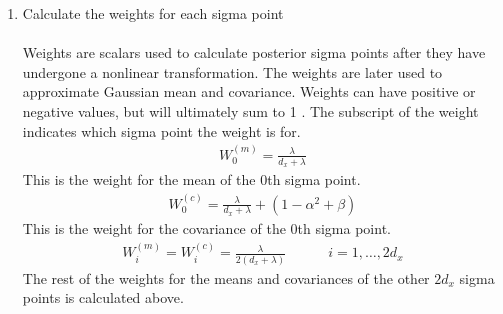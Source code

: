 \begin{enumerate}
        \item Calculate the weights for each sigma point \\ \\
        Weights are scalars used to calculate posterior sigma points after they have undergone a nonlinear transformation. The weights are later used to approximate Gaussian mean and covariance. Weights can have positive or negative values, but will ultimately sum to 1 \cite{article6}. The subscript of the weight indicates which sigma point the weight is for. 
        \begin{align*}
        W^{(m)}_{0} = \frac{\lambda}{d_{x}+ \lambda} 
         \end{align*}
         This is the weight for the mean of the 0th sigma point. 
        \begin{align*}
        W^{(c)}_{0} = \frac{\lambda}{d_{x}+ \lambda} + (1 - \alpha^{2} + \beta) 
         \end{align*}
         This is the weight for the covariance of the 0th sigma point. 
        \begin{align*}
        W^{(m)}_{i} = W^{(c)}_{i} = \frac{\lambda}{2(d_{x}+ \lambda) } \quad \quad \quad i=1,\dots,2d_{x}
            \end{align*}
           The rest of the weights for the means and covariances of the other $2 d_x$ sigma points is calculated above.
      

\end{enumerate}
